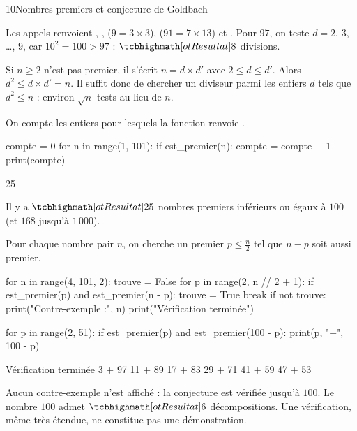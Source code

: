 \begin{corrige}{10}{Nombres premiers et conjecture de Goldbach}
\begin{questions}
  \item Les appels renvoient , ,  ($9=3\times3$),  ($91=7\times13$) et .
    Pour $97$, on teste $d=2$, $3$, …, $9$, car $10^{2}=100>97$ : $\res{8}$ divisions.
  \item Si $n\geq2$ n'est pas premier, il s'écrit $n=d\times d'$ avec $2\leq d\leq d'$. Alors $d^{2}\leq d\times d'=n$. Il suffit donc de
    chercher un diviseur parmi les entiers $d$ tels que $d^{2}\leq n$ : environ $\sqrt n$ tests au lieu de $n$.
  \item On compte les entiers pour lesquels la fonction renvoie .
\begin{codecote}[0.48]
\begin{pythoncol}
compte = 0
for n in range(1, 101):
    if est_premier(n):
        compte = compte + 1
print(compte)
\end{pythoncol}
\cote
\begin{consolecol}
25
\end{consolecol}

\medskip
Il y a $\res{25}$ nombres premiers inférieurs ou égaux à $100$ (et $168$ jusqu'à $1\,000$).
\end{codecote}
  \item Pour chaque nombre pair $n$, on cherche un premier $p\leq\frac n2$ tel que $n-p$ soit aussi premier.
\begin{python}
for n in range(4, 101, 2):
    trouve = False
    for p in range(2, n // 2 + 1):
        if est_premier(p) and est_premier(n - p):
            trouve = True
            break
    if not trouve:
        print("Contre-exemple :", n)
print("Vérification terminée")

for p in range(2, 51):
    if est_premier(p) and est_premier(100 - p):
        print(p, "+", 100 - p)
\end{python}
\begin{codecote}[0.4]
\begin{consolecol}
Vérification terminée
3 + 97
11 + 89
17 + 83
29 + 71
41 + 59
47 + 53
\end{consolecol}
\cote
Aucun contre-exemple n'est affiché : la conjecture est vérifiée jusqu'à $100$. Le nombre $100$ admet $\res{6}$ décompositions.
Une vérification, même très étendue, ne constitue pas une démonstration.
\end{codecote}
\end{questions}
\end{corrige}
